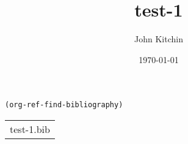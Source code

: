 \documentclass[11pt]{article}
\author{John Kitchin}
\date{\today}
\title{test-1}
\begin{document}
\tableofcontents


\cite{kitchin-2015-examp}   \cite[test]{kitchin-2015-examp}

\begin{verbatim}
(org-ref-find-bibliography)
\end{verbatim}

\begin{center}
\begin{tabular}{l}
test-1.bib\\
\end{tabular}
\end{center}


\end{document}
